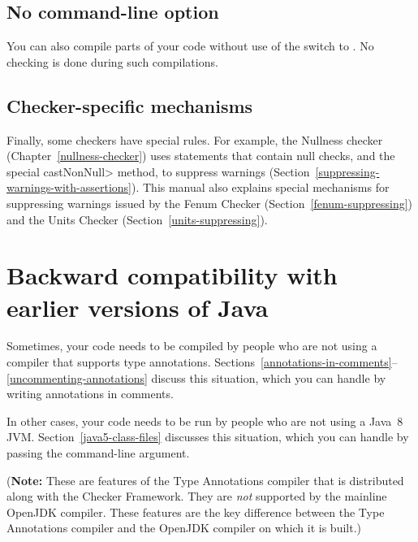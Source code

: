 \subsection{No  command-line option\label{no-processor}}

You can also compile parts of your code without use of the
 switch to .  No checking is done during
such compilations.

\subsection{Checker-specific mechanisms\label{checker-specific-suppression}}

Finally, some checkers have special rules.  For example, the Nullness
checker (Chapter~\ref{nullness-checker}) uses  statements that contain
null checks, and the special \<castNonNull> method, to suppress warnings
(Section~\ref{suppressing-warnings-with-assertions}).
This manual also explains special mechanisms for
suppressing warnings issued by the Fenum Checker
(Section~\ref{fenum-suppressing}) and the Units Checker
(Section~\ref{units-suppressing}).


\section{Backward compatibility with earlier versions of Java\label{backward-compatibility}}

Sometimes, your code needs to be compiled by people who are not using a
compiler that supports type annotations.
Sections~\ref{annotations-in-comments}--\ref{uncommenting-annotations}
discuss this situation, which you can handle by writing annotations in
comments.

In other cases, your code needs to be run by people who are not using a Java~8
JVM\@.  Section~\ref{java5-class-files} discusses this situation, which
you can handle by passing the  command-line argument.

(\textbf{Note:} These are features of the Type Annotations compiler that is
distributed along with the Checker Framework.  They are \emph{not}
supported by the mainline OpenJDK compiler.  These features are the key
difference between the Type Annotations compiler and the OpenJDK compiler
on which it is built.)



